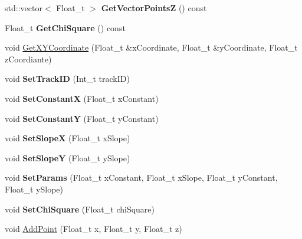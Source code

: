 \begin{DoxyCompactItemize}
\mbox{\label{class_telescope_track_a32ecf90e39c07c3efd0181d909b1c9d0}} 
std\+::vector$<$ Float\+\_\+t $>$ {\bfseries Get\+Vector\+PointsZ} () const
\item 
\mbox{\label{class_telescope_track_a33d079747c4389c92b7e8136b0470ea6}} 
Float\+\_\+t {\bfseries Get\+Chi\+Square} () const
\item 
void \mbox{\hyperlink{class_telescope_track_a6ab532f538116f6cdc97a4258b667d03}{Get\+X\+Y\+Coordinate}} (Float\+\_\+t \&x\+Coordinate, Float\+\_\+t \&y\+Coordinate, Float\+\_\+t z\+Coordiante)
\item 
\mbox{\label{class_telescope_track_ab1956a4c99f2d2090fd3b7bcf8122254}} 
void {\bfseries Set\+Track\+ID} (Int\+\_\+t track\+ID)
\item 
\mbox{\label{class_telescope_track_a251dd7613716b239ebfe7e2eda3f8ada}} 
void {\bfseries Set\+ConstantX} (Float\+\_\+t x\+Constant)
\item 
\mbox{\label{class_telescope_track_a4bdb85c9ea42c031b8eb575aae954ff0}} 
void {\bfseries Set\+ConstantY} (Float\+\_\+t y\+Constant)
\item 
\mbox{\label{class_telescope_track_a89ac5a607b363654bc06abc7da8107a2}} 
void {\bfseries Set\+SlopeX} (Float\+\_\+t x\+Slope)
\item 
\mbox{\label{class_telescope_track_a9a05d679307b13d7a962312222085bbe}} 
void {\bfseries Set\+SlopeY} (Float\+\_\+t y\+Slope)
\item 
\mbox{\label{class_telescope_track_a9f4224a90fd4a19773513aab71b5e4e2}} 
void {\bfseries Set\+Params} (Float\+\_\+t x\+Constant, Float\+\_\+t x\+Slope, Float\+\_\+t y\+Constant, Float\+\_\+t y\+Slope)
\item 
\mbox{\label{class_telescope_track_aff1d178648c091a89af341ce24133355}} 
void {\bfseries Set\+Chi\+Square} (Float\+\_\+t chi\+Square)
\item 
void \mbox{\hyperlink{class_telescope_track_afb3be5a992879f15abfb90906fd70856}{Add\+Point}} (Float\+\_\+t x, Float\+\_\+t y, Float\+\_\+t z)

\end{DoxyCompactItemize}
